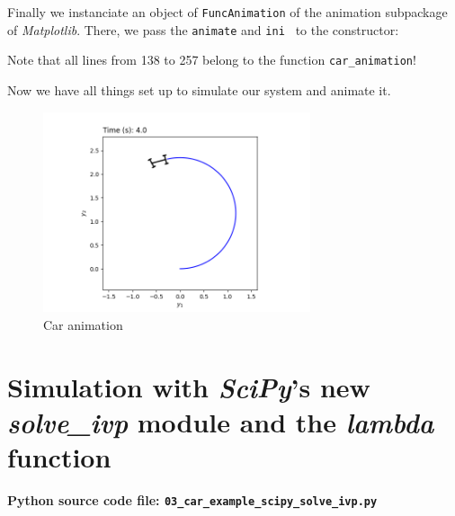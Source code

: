 \documentclass[a4paper,11pt,headings=standardclasses,parskip=half]{scrartcl}
\newcommand{\listcode}[3]{}
\newcommand{\listcodeanim}[2]{\listcode{#1}{#2}{../sim/02_car_example_animation.py}}
\newcommand{\scipy}{\emph{SciPy}\xspace}
\newcommand{\mpl}{\emph{Matplotlib}\xspace}
\begin{document}
Finally we instanciate an object of \texttt{FuncAnimation} of the animation subpackage of \mpl. There, we pass the \texttt{animate} and \texttt{ini } to the constructor:
\listcodeanim{252}{258}

Note that all lines from 138 to 257 belong to the function \texttt{car\_animation}!

Now we have all things set up to simulate our system and animate it.
\listcodeanim{274}{277}

\begin{figure}[ht]
	\centering
	\includegraphics[width=0.7\textwidth]{img/animation}
	\caption{Car animation}
	\label{fig:animation}
\end{figure}
        



\section{Simulation with \scipy's new \emph{solve\_ivp} module and the \emph{lambda} function}\label{sec:ScipyLambda}

\textbf{Python source code file: \texttt{03\_car\_example\_scipy\_solve\_ivp.py}}
\end{document}
